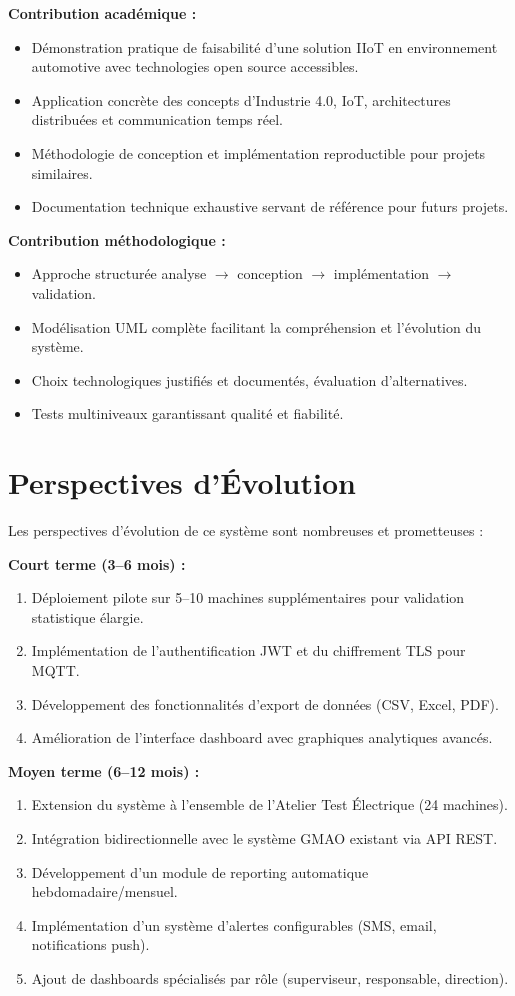 \textbf{Contribution académique :}
\begin{itemize}
    \item Démonstration pratique de faisabilité d'une solution IIoT en environnement automotive avec technologies open source accessibles.
    \item Application concrète des concepts d'Industrie 4.0, IoT, architectures distribuées et communication temps réel.
    \item Méthodologie de conception et implémentation reproductible pour projets similaires.
    \item Documentation technique exhaustive servant de référence pour futurs projets.
\end{itemize}

\textbf{Contribution méthodologique :}
\begin{itemize}
    \item Approche structurée analyse $\rightarrow$ conception $\rightarrow$ implémentation $\rightarrow$ validation.
    \item Modélisation UML complète facilitant la compréhension et l'évolution du système.
    \item Choix technologiques justifiés et documentés, évaluation d'alternatives.
    \item Tests multiniveaux garantissant qualité et fiabilité.
\end{itemize}

\section*{Perspectives d'Évolution}

Les perspectives d'évolution de ce système sont nombreuses et prometteuses :

\textbf{Court terme (3--6 mois) :}
\begin{enumerate}
    \item Déploiement pilote sur 5--10 machines supplémentaires pour validation statistique élargie.
    \item Implémentation de l'authentification JWT et du chiffrement TLS pour MQTT.
    \item Développement des fonctionnalités d'export de données (CSV, Excel, PDF).
    \item Amélioration de l'interface dashboard avec graphiques analytiques avancés.
\end{enumerate}

\textbf{Moyen terme (6--12 mois) :}
\begin{enumerate}
    \item Extension du système à l'ensemble de l'Atelier Test Électrique (24 machines).
    \item Intégration bidirectionnelle avec le système GMAO existant via API REST.
    \item Développement d'un module de reporting automatique hebdomadaire/mensuel.
    \item Implémentation d'un système d'alertes configurables (SMS, email, notifications push).
    \item Ajout de dashboards spécialisés par rôle (superviseur, responsable, direction).
\end{enumerate}

